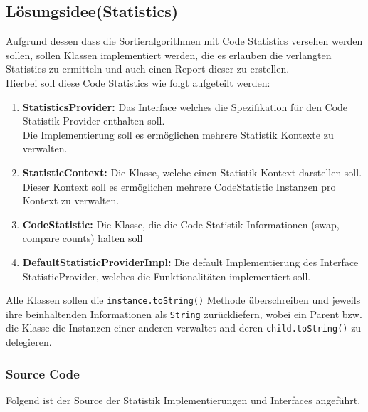 \documentclass[11pt, a4paper, twoside]{article}   	%
\newcommand{\srcDir}{../src/main/java}
\newcommand{\mainPackage}{\srcDir/at/fhooe/swe4/lab3}
\newcommand{\ideaSection}{Lösungsidee}
\newcommand{\inlinecode}{\lstinline[style=inlineSource]}
\begin{document}
\subsection{\ideaSection \hspace{2mm}(Statistics)}
Aufgrund dessen dass die Sortieralgorithmen mit Code Statistics versehen werden sollen, sollen Klassen implementiert werden, die es erlauben die verlangten Statistics zu ermitteln und auch einen Report dieser zu erstellen.\\
Hierbei soll diese Code Statistics wie folgt aufgeteilt werden:
\begin{enumerate}
	\item \textbf{StatisticsProvider:} Das Interface welches die Spezifikation für den Code Statistik Provider enthalten soll.\\
	Die Implementierung soll es ermöglichen mehrere Statistik Kontexte zu verwalten.
	\item \textbf{StatisticContext:} Die Klasse, welche einen Statistik Kontext darstellen soll.\\
	Dieser Kontext soll es ermöglichen mehrere CodeStatistic Instanzen pro Kontext zu verwalten.
	\item \textbf{CodeStatistic:} Die Klasse, die die Code Statistik Informationen (swap, compare counts) halten soll
	\item \textbf{DefaultStatisticProviderImpl:} Die default Implementierung des Interface StatisticProvider, welches die Funktionalitäten implementiert soll.
\end{enumerate}
Alle Klassen sollen die \inlinecode{instance.toString()}  Methode überschreiben und jeweils ihre beinhaltenden Informationen als \inlinecode{String} zurückliefern, wobei ein Parent bzw. die Klasse die Instanzen einer anderen verwaltet and deren \inlinecode{child.toString()} zu delegieren.
\newpage
\subsubsection{Source Code}
Folgend ist der Source der Statistik Implementierungen und Interfaces angeführt.




\end{document}
